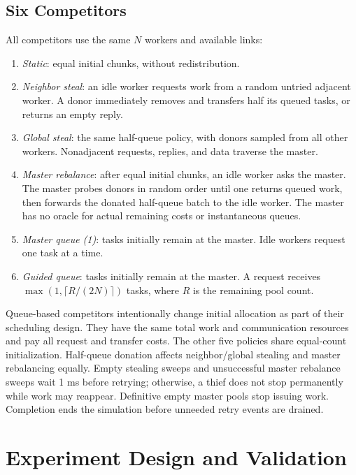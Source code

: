\documentclass[10pt,journal,twocolumn]{IEEEtran}
\begin{document}
\subsection{Six Competitors}
All competitors use the same $N$ workers and available links:
\begin{enumerate}
\item \emph{Static}: equal initial chunks, without redistribution.
\item \emph{Neighbor steal}: an idle worker requests work from a random untried adjacent worker. A donor immediately removes and transfers half its queued tasks, or returns an empty reply.
\item \emph{Global steal}: the same half-queue policy, with donors sampled from all other workers. Nonadjacent requests, replies, and data traverse the master.
\item \emph{Master rebalance}: after equal initial chunks, an idle worker asks the master. The master probes donors in random order until one returns queued work, then forwards the donated half-queue batch to the idle worker. The master has no oracle for actual remaining costs or instantaneous queues.
\item \emph{Master queue (1)}: tasks initially remain at the master. Idle workers request one task at a time.
\item \emph{Guided queue}: tasks initially remain at the master. A request receives $\max(1,\lceil R/(2N)\rceil)$ tasks, where $R$ is the remaining pool count.
\end{enumerate}

Queue-based competitors intentionally change initial allocation as part of their scheduling design. They have the same total work and communication resources and pay all request and transfer costs. The other five policies share equal-count initialization. Half-queue donation affects neighbor/global stealing and master rebalancing equally. Empty stealing sweeps and unsuccessful master rebalance sweeps wait 1 ms before retrying; otherwise, a thief does not stop permanently while work may reappear. Definitive empty master pools stop issuing work. Completion ends the simulation before unneeded retry events are drained.

\section{Experiment Design and Validation}
\end{document}
